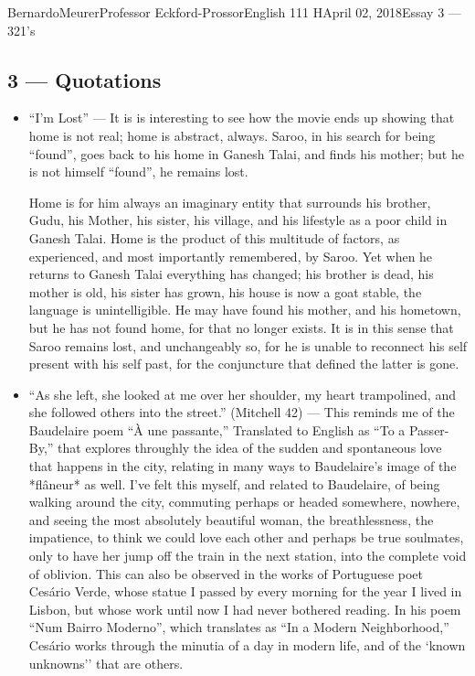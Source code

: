 \documentclass[12pt,letterpaper]{article}
\begin{document}
\begin{mla}{Bernardo}{Meurer}{Professor Eckford-Prossor}{English 111 H}{April 02, 2018}{Essay 3 --- 321's}
    \subsection*{3 --- Quotations}
    \begin{itemize}
        \item ``I'm Lost'' ---
It is is interesting to see how the movie ends up showing that home is not real; home is abstract, always. Saroo, in his search for being ``found'', goes back to his home in Ganesh Talai, and finds his mother; but he is not himself ``found'', he remains lost.

Home is for him always an imaginary entity that surrounds his brother, Gudu, his Mother, his sister, his village, and his lifestyle as a poor child in Ganesh Talai. Home is the product of this multitude of factors, as experienced, and most importantly remembered, by Saroo. Yet when he returns to Ganesh Talai everything has changed; his brother is dead, his mother is old, his sister has grown, his house is now a goat stable, the language is unintelligible. He may have found his mother, and his hometown,  but he has not found home, for that no longer exists. It is in this sense that Saroo remains lost, and unchangeably so, for he is unable to reconnect his self present with his self past, for the conjuncture that defined the latter is gone.
        \item ``As she left, she looked at me over her shoulder, my heart trampolined, and she followed others into the street.'' (Mitchell 42)
    --- This reminds me of the Baudelaire poem ``À une passante,'' Translated to English as ``To a Passer-By,'' that explores throughly the idea of the sudden and spontaneous love that happens in the city, relating in many ways to Baudelaire's image of the *flâneur* as well. I've felt this myself, and related to Baudelaire, of being walking around the city, commuting perhaps or headed somewhere, nowhere, and seeing the most absolutely beautiful woman, the breathlessness, the impatience, to think we could love each other and perhaps be true soulmates, only to have her jump off the train in the next station, into the complete void of oblivion.
    This can also be observed in the works of Portuguese poet Cesário Verde, whose statue I passed by every morning for the year I lived in Lisbon, but whose work until now I had never bothered reading. In his poem ``Num Bairro Moderno'', which translates as ``In a Modern Neighborhood,'' Cesário works through the minutia of a day in modern life, and of the `known unknowns'' that are others.

\end{itemize}
\end{mla}
\end{document}
